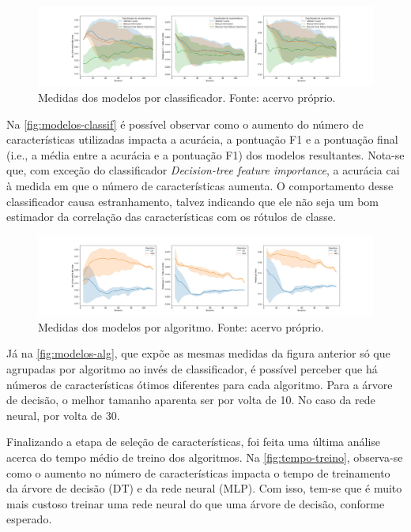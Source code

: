 \documentclass[12pt]{article}
\begin{document}
\begin{figure}[t!]
    \includegraphics[width=\linewidth]{figures/modelos_por_classificador}
    \caption{Medidas dos modelos por classificador. Fonte: acervo próprio.}
    \label{fig:modelos-classif}
\end{figure}

Na \autoref{fig:modelos-classif} é possível observar como o aumento do número de características utilizadas impacta a acurácia, a pontuação F1 e a pontuação final (i.e., a média entre a acurácia e a pontuação F1) dos modelos resultantes. Nota-se que, com exceção do classificador \textit{Decision-tree feature importance}, a acurácia cai à medida em que o número de características aumenta. O comportamento desse classificador causa estranhamento, talvez indicando que ele não seja um bom estimador da correlação das características com os rótulos de classe.

\begin{figure}[t!]
    \includegraphics[width=\linewidth]{figures/modelos_por_algoritmo}
    \caption{Medidas dos modelos por algoritmo. Fonte: acervo próprio.}
    \label{fig:modelos-alg}
\end{figure}

Já na \autoref{fig:modelos-alg}, que expõe as mesmas medidas da figura anterior só que agrupadas por algoritmo ao invés de classificador, é possível perceber que há números de características ótimos diferentes para cada algoritmo. Para a árvore de decisão, o melhor tamanho aparenta ser por volta de 10. No caso da rede neural, por volta de 30.

Finalizando a etapa de seleção de características, foi feita uma última análise acerca do tempo médio de treino dos algoritmos. Na  \autoref{fig:tempo-treino}, observa-se como o aumento no número de características impacta o tempo de treinamento da árvore de decisão (DT) e da rede neural (MLP). Com isso, tem-se que é muito mais custoso treinar uma rede neural do que uma árvore de decisão, conforme esperado. 
\end{document}
